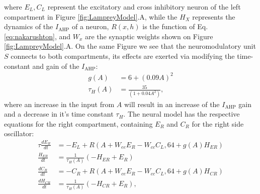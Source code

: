 \documentclass[10pt,a4paper]{article}
\begin{document}
where $E_L, C_L$ represent the excitatory and cross inhibitory neuron of the left compartment in Figure \ref{fig:LampreyModel}.A, while the $H_{X}$ represents the dynamics of the $I_{\text{AHP}}$ of a neuron, $R(x,h)$ is the \cite{naka1966s} function of Eq. \eqref{eq:nakarushton}, and $W_x$ are the synaptic weights shown on Figure  \ref{fig:LampreyModel}.A. On the same Figure we see that the neuromodulatory unit $S$ connects to both compartments, its effects are exerted via modifying the time-constant and gain of the $I_{\text{AHP}}$:
\begin{align}
g(A) &= 6 + \left( 0.09A \right)^2\\
\tau_H(A) &= \frac{35}{(1 + 0.04 A^2)},
\end{align}
where an increase in the input from $A$ will result in an increase of the $I_{\text{AHP}}$ gain and a decrease in it's time constant $\tau_H$.
 The neural model has the respective equations for the right compartment, containing  $E_R$ and $C_R$ for the right side oscillator:
\begin{align}
\tau \frac{dE_R}{dt} & = - E_L +  R( A + W_{ee} E_R - W_{cc}C_L, 64 + g(A)H_{ER})\\
\frac{H_{ER}}{dt} &= \frac{1}{\tau_H(A)}(-H_{ER}+E_R)\\
\frac{dC_R}{dt} &= -C_R + R( A + W_{ce}E_R - W_{cc}C_L, 64+g(A)H_{CR})\\
\frac{dH_{CR}}{dt} &= \frac{1}{\tau_H(A)}(-H_{CR}+E_R),
\end{align}
\end{document}
